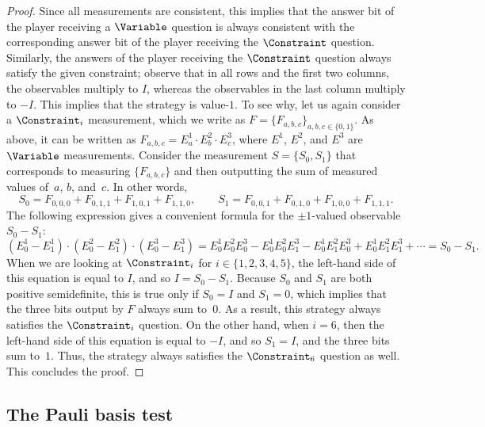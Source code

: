 \begin{proof}
  Since all measurements are consistent, this implies that the answer bit of the
  player receiving a $\Variable$ question is always consistent with the
  corresponding answer bit of the player receiving the $\Constraint$ question.
  Similarly, the answers of the player receiving the $\Constraint$ question
  always satisfy the given constraint; observe that in all rows and the first
  two columns, the observables multiply to $I$, whereas the observables in the
  last column multiply to $-I$.
  This implies that the strategy is value-$1$.
  To see why, 
  let us again consider a $\Constraint_i$ measurement, which we write as $F=\{F_{a, b, c}\}_{a, b, c \in \{0, 1\}}$.
  As above, it can be written as  $F_{a, b, c} = E^1_a \cdot E^2_b \cdot E^3_c$, where $E^1$, $E^2$, and $E^3$ are $\Variable$ measurements.
  Consider the measurement $S=\{S_0, S_1\}$ that corresponds to measuring $\{F_{a, b, c}\}$ and then outputting the sum of measured values of~$a$, $b$, and~$c$.
  In other words,
  \begin{equation*}
  S_0 = F_{0, 0, 0} + F_{0, 1, 1} + F_{1, 0, 1} + F_{1, 1, 0},
  \qquad
  S_1 = F_{0, 0, 1} + F_{0, 1, 0} + F_{1, 0, 0} + F_{1, 1, 1}.
  \end{equation*}
  The following expression gives a convenient formula for the $\pm 1$-valued observable $S_0 - S_1$:
  \begin{equation*}
  (E_0^1 - E_1^1) \cdot (E_0^2 - E_1^2) \cdot (E_0^3 - E_1^3)
  = E_0^1 E_0^2 E_0^3 - E_0^1 E_0^2 E_1^3 - E_0^1 E_1^2 E_0^3 + E_0^1 E_1^2 E_1^3 + \cdots
  = S_0 - S_1.
  \end{equation*}
  When we are looking at $\Constraint_i$ for $i \in \{1, 2, 3, 4, 5\}$,
  the left-hand side of this equation is equal to $I$, and so $I = S_0- S_1$.
  Because $S_0$ and $S_1$ are both positive semidefinite,
  this is true only if $S_0 = I$ and $S_1 = 0$, which implies that the three bits output by $F$ always sum to~$0$.
  As a result, this strategy always satisfies the $\Constraint_i$ question.
  On the other hand, when $i = 6$, then the left-hand side of this equation is equal to $-I$,
  and so $S_1 = I$, and the three bits sum to~$1$.
  Thus, the strategy always satisfies the $\Constraint_6$ question as well.
  This concludes the proof.
\end{proof}

\subsection{The Pauli basis test}
\label{sec:pauli-verifier}

